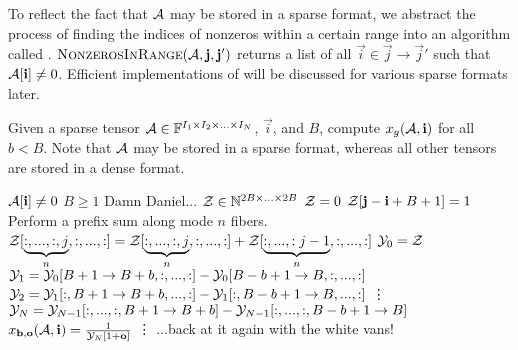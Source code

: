     To reflect the fact that $\mathbf{\mathcal{A}}$ may be stored in a sparse format, we abstract the process of finding the indices of nonzeros within a certain range into an algorithm called . $\textproc{NonzerosInRange}(\Ten{A}, \vec{j}, \vec{j}')$ returns a list of all $\vec{i} \in \vec{j} \to \vec{j}'$ such that $\mathbf{\mathcal{A}}[\mathbf{i}] \neq 0$. Efficient implementations of  will be discussed for various sparse formats later.

    \begin{samepage}
    \begin{alg}
      Given a sparse tensor $\mathbf{\mathcal{A}} \in \mathbb{F}^{I_1 \times I_2 \times ... \times I_N}$, $\vec{i}$, and $B$, compute $x_g(\mathbf{\mathcal{A}}, \mathbf{i})$ for all $b < B$. Note that $\mathbf{\mathcal{A}}$ may be stored in a sparse format, whereas all other tensors are stored in a dense format.
      \begin{algorithmic}[1]
        \Require
        \Statex $\mathbf{\mathcal{A}}[\mathbf{i}] \neq 0$
        \Statex $B \geq 1$
        \Statex Damn Daniel...
          \State $\mathbf{\mathcal{Z}} \in \mathbb{N}^{2B \times ... \times 2B}$
          \State $\mathbf{\mathcal{Z}} = 0$
           \label{alg:depositrestricted:loop}
            \State $\mathbf{\mathcal{Z}}[\mathbf{j} - \mathbf{i} + B + 1] = 1$
          \EndFor
              \Comment Perform a prefix sum along mode $n$ fibers.
              \State $\mathbf{\mathcal{Z}}[\underbrace{:,...,:,j}_{n}, :, ..., :] = \mathbf{\mathcal{Z}}[\underbrace{:,...,:,j}_{n}, :, ..., :] + \mathbf{\mathcal{Z}}[\underbrace{:,...,:j - 1}_{n}, :, ..., :]$
            \EndFor
          \EndFor
          \State $\mathbf{\mathcal{Y}}_0 = \mathbf{\mathcal{Z}}$
            \State $\mathbf{\mathcal{Y}}_1 = \mathbf{\mathcal{Y}}_0[B + 1 \to B + b, :, ..., :] - \mathbf{\mathcal{Y}}_0[B - b + 1 \to B, :, ..., :]$
              \State $\mathbf{\mathcal{Y}}_2 = \mathbf{\mathcal{Y}}_1[:, B + 1 \to B + b, ..., :] - \mathbf{\mathcal{Y}}_1[:, B - b + 1 \to B, ..., :]$
              \Statex \vdots\nopagebreak
                \State $\mathbf{\mathcal{Y}}_N = \mathbf{\mathcal{Y}}_{N - 1}[:, ..., :, B + 1 \to B + b] - \mathbf{\mathcal{Y}}_{N - 1}[:, ..., :, B - b + 1 \to B]$
                  \State $x_{\mathbf{b}, \mathbf{o}}(\mathbf{\mathcal{A}}, \mathbf{i}) = \frac{1}{\mathbf{\mathcal{Y}}_N[1 + \mathbf{o}]}$
                \EndFor
              \EndFor
              \Statex \vdots\nopagebreak
            \EndFor
          \EndFor
        \EndFunction
        \Ensure
        \Statex ...back at it again with the white vans!
      \end{algorithmic}
      \label{alg:sample}
    \end{alg}
    \end{samepage}

